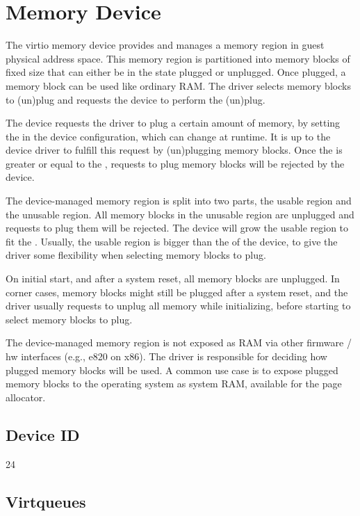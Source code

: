 \section{Memory Device}\label{sec:Device Types / Memory Device}

The virtio memory device provides and manages a memory region in guest
physical address space.  This memory region is partitioned into memory
blocks of fixed size that can either be in the state plugged or unplugged.
Once plugged, a memory block can be used like ordinary RAM.  The driver
selects memory blocks to (un)plug and requests the device to perform the
(un)plug.

The device requests the driver to plug a certain amount of memory, by
setting the  in the device configuration, which can
change at runtime.  It is up to the device driver to fulfill this request
by (un)plugging memory blocks.  Once the  is greater or
equal to the , requests to plug memory blocks will be
rejected by the device.

The device-managed memory region is split into two parts, the usable region
and the unusable region.  All memory blocks in the unusable region are
unplugged and requests to plug them will be rejected.  The device will grow
the usable region to fit the .  Usually, the usable
region is bigger than the  of the device, to give the
driver some flexibility when selecting memory blocks to plug.

On initial start, and after a system reset, all memory blocks are
unplugged.  In corner cases, memory blocks might still be plugged after a
system reset, and the driver usually requests to unplug all memory while
initializing, before starting to select memory blocks to plug.

The device-managed memory region is not exposed as RAM via other firmware
/ hw interfaces (e.g., e820 on x86).  The driver is responsible for
deciding how plugged memory blocks will be used.  A common use case is to
expose plugged memory blocks to the operating system as system RAM,
available for the page allocator.

\subsection{Device ID}\label{sec:Device Types / Memory Device / Device ID}
24

\subsection{Virtqueues}\label{sec:Device Types / Memory Device / Virtqueues}

